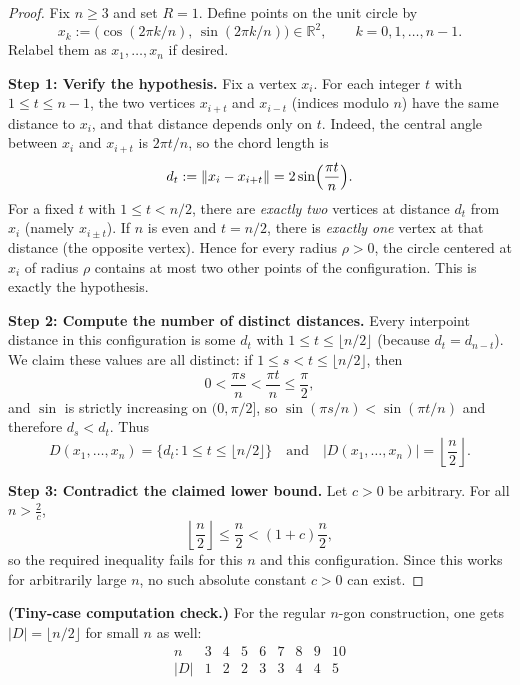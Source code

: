 \begin{proof}
Fix $n\ge 3$ and set $R=1$. Define points on the unit circle by
\[
 x_k := \bigl(\cos(2\pi k/n),\,\sin(2\pi k/n)\bigr)\in\mathbb{R}^2,\qquad k=0,1,\dots,n-1.
\]
Relabel them as $x_1,\dots,x_n$ if desired.

\medskip
\noindent\textbf{Step 1: Verify the hypothesis.}
Fix a vertex $x_i$. For each integer $t$ with $1\le t\le n-1$, the two vertices $x_{i+t}$ and $x_{i-t}$ (indices modulo $n$) have the same distance to $x_i$, and that distance depends only on $t$.
Indeed, the central angle between $x_i$ and $x_{i+t}$ is $2\pi t/n$, so the chord length is
\[
 d_t := \|x_i-x_{i+t}\| = 2\sin\Bigl(\frac{\pi t}{n}\Bigr).
\]
For a fixed $t$ with $1\le t< n/2$, there are \emph{exactly two} vertices at distance $d_t$ from $x_i$ (namely $x_{i\pm t}$).
If $n$ is even and $t=n/2$, there is \emph{exactly one} vertex at that distance (the opposite vertex).
Hence for every radius $\rho>0$, the circle centered at $x_i$ of radius $\rho$ contains at most two other points of the configuration. This is exactly the hypothesis.

\medskip
\noindent\textbf{Step 2: Compute the number of distinct distances.}
Every interpoint distance in this configuration is some $d_t$ with $1\le t\le \lfloor n/2\rfloor$ (because $d_t=d_{n-t}$).
We claim these values are all distinct:
if $1\le s<t\le\lfloor n/2\rfloor$, then
\[ 0<\frac{\pi s}{n}<\frac{\pi t}{n}\le\frac{\pi}{2}, \]
and $\sin$ is strictly increasing on $(0,\pi/2]$, so
$\sin(\pi s/n)<\sin(\pi t/n)$ and therefore $d_s<d_t$.
Thus
\[
D(x_1,\dots,x_n)=\{d_t: 1\le t\le \lfloor n/2\rfloor\}
\quad\text{and}\quad
|D(x_1,\dots,x_n)|=\left\lfloor\frac{n}{2}\right\rfloor.
\]

\medskip
\noindent\textbf{Step 3: Contradict the claimed lower bound.}
Let $c>0$ be arbitrary. For all $n>\frac{2}{c}$,
\[
\left\lfloor\frac{n}{2}\right\rfloor\le \frac{n}{2} < (1+c)\frac{n}{2},
\]
so the required inequality fails for this $n$ and this configuration.
Since this works for arbitrarily large $n$, no such absolute constant $c>0$ can exist.
\end{proof}

\medskip
\noindent\textbf{(Tiny-case computation check.)}
For the regular $n$-gon construction, one gets $|D|=\lfloor n/2\rfloor$ for small $n$ as well:
\[
\begin{array}{c|cccccccc}
 n & 3 & 4 & 5 & 6 & 7 & 8 & 9 & 10\\\hline
 |D| & 1 & 2 & 2 & 3 & 3 & 4 & 4 & 5
\end{array}
\]

